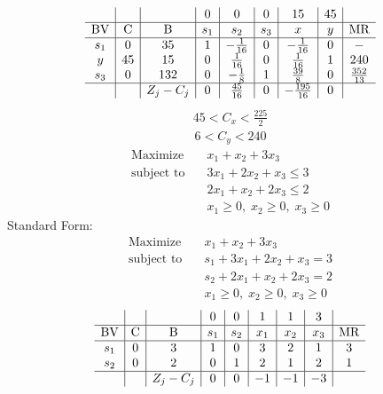 \documentclass{article}
\begin{document}
\begin{align*}
\begin{array}{c|c|c|c|c|c|c|c|c}
 &  &  & 0 & 0 & 0 & 15 & 45 & \\
\hline
\text{BV} & \text{C} & \text{B} & s_{1} & s_{2} & s_{3} & x & y & \text{MR} \\
\hline
s_{1} & 0 & 35 & 1 & -\frac{1}{16} & 0 & -\frac{1}{16} & 0 & - \\
y & 45 & 15 & 0 & \frac{1}{16} & 0 & \frac{1}{16} & 1 & 240 \\
s_{3} & 0 & 132 & 0 & -\frac{1}{8} & 1 & \frac{39}{8} & 0 & \frac{352}{13} \\
\hline
 &  & Z_j-C_j & 0 & \frac{45}{16} & 0 & -\frac{195}{16} & 0 & \\
\end{array}
\end{align*}
\begin{align*}
45<C_{x}<\frac{225}{2}\end{align*}
\begin{align*}
6<C_{y}<240\end{align*}
\begin{align*}
\text{Maximize} \quad & x_{1} + x_{2} + 3x_{3}\\
\text{subject to} \quad
& 3x_{1} + 2x_{2} + x_{3}\le3\\
& 2x_{1} + x_{2} + 2x_{3}\le2\\
& x_{1}\ge0,\; x_{2}\ge0,\; x_{3}\ge0\end{align*}
Standard Form:\\
\begin{align*}
\text{Maximize} \quad & x_{1} + x_{2} + 3x_{3}\\
\text{subject to} \quad
& s_{1} + 3x_{1} + 2x_{2} + x_{3}=3\\
& s_{2} + 2x_{1} + x_{2} + 2x_{3}=2\\
& x_{1}\ge0,\; x_{2}\ge0,\; x_{3}\ge0\end{align*}
\begin{align*}
\begin{array}{c|c|c|c|c|c|c|c|c}
 &  &  & 0 & 0 & 1 & 1 & 3 & \\
\hline
\text{BV} & \text{C} & \text{B} & s_{1} & s_{2} & x_{1} & x_{2} & x_{3} & \text{MR} \\
\hline
s_{1} & 0 & 3 & 1 & 0 & 3 & 2 & 1 & 3 \\
s_{2} & 0 & 2 & 0 & 1 & 2 & 1 & 2 & 1 \\
\hline
 &  & Z_j-C_j & 0 & 0 & -1 & -1 & -3 & \\
\end{array}
\end{align*}
\end{document}
